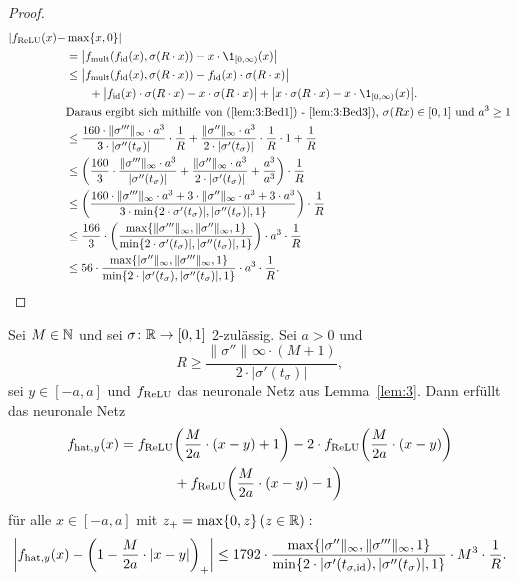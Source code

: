 \begin{proof}
\begin{equation*}
\begin{split}
|f_{\ReLU}(x) - & \max\{x, 0\}|  \\
& = \big| f_{\mult}(f_{\id}(x), \sigma(R \cdot x)) - x \cdot \1_{[0, \infty)}(x)\big| \\
& \leq \big| f_{\mult}(f_{\id}(x), \sigma(R \cdot x)) - f_{\id}(x)\cdot\sigma(R \cdot x)\big| \\
& \qquad + \big| f_{\id}(x)\cdot\sigma(R \cdot x) - x \cdot \sigma(R \cdot x)\big| + \big| x \cdot \sigma(R \cdot x) - x \cdot \1_{[0, \infty)}(x)\big|. \\
& \text{Daraus ergibt sich mithilfe von (\ref{lem:3:Bed1}) - \ref{lem:3:Bed3}), $\sigma(Rx) \in [0, 1]$ und $a^3 \geq 1$}\\
& \leq \frac{160 \cdot \|\sigma'''\|_{\infty} \cdot a ^3}{3 \cdot |\sigma''(t_{\sigma})|} \cdot \frac{1}{R} + \frac{\|\sigma''\|_{\infty} \cdot a^3}{2 \cdot |\sigma'(t_{\sigma})|} \cdot \frac{1}{R} \cdot 1+ \frac{1}{R} \\
& \leq \bigg(\frac{160}{3} \cdot \frac{\|\sigma'''\|_{\infty} \cdot a ^3}{|\sigma''(t_{\sigma})|} + \frac{\|\sigma''\|_{\infty} \cdot a^3}{2 \cdot |\sigma'(t_{\sigma})|} + \frac{a^3}{a^3} \bigg) \cdot \frac{1}{R} \\ 
& \leq \bigg(\frac{160 \cdot\|\sigma'''\|_{\infty} \cdot a ^3 + 3 \cdot \|\sigma''\|_{\infty} \cdot a^3 + 3 \cdot a^3}{3 \cdot \min\{ 2 \cdot \sigma'(t_{\sigma})|, |\sigma''(t_{\sigma})|, 1\}}\bigg) \cdot \frac{1}{R}\\
& \leq \frac{166}{3} \cdot \bigg(\frac{\max\{\|\sigma'''\|_{\infty}, \|\sigma''\|_{\infty} , 1\}}{\min\{ 2 \cdot \sigma'(t_{\sigma})|, |\sigma''(t_{\sigma})|, 1\}}\bigg) \cdot a^3 \cdot  \frac{1}{R} \\
& \leq 56 \cdot \frac{\max\{|\sigma''\|_{\infty}, \|\sigma'''\|_{\infty}, 1\}}{\min\{2 \cdot |\sigma'(t_{\sigma}), |\sigma''(t_{\sigma})|, 1\}} \cdot a^3 \cdot \frac{1}{R}.
\end{split}
\end{equation*}
  \end{proof}
  \begin{lem}
  \label{lem:4}
  Sei $M \in \mathbb{N}$ und sei $\sigma\colon \mathbb{R} \to [0, 1]$ 2-zulässig. Sei $a > 0$ und $$R \geq \frac{\|\sigma''\|_{}\infty \cdot (M + 1)}{2 \cdot |\sigma'(t_{\sigma})|},$$ sei $y \in [-a, a]$ und $f_{\mathrm{ReLU}}$ das neuronale Netz aus Lemma~\ref{lem:3}. Dann erfüllt das neuronale Netz 
  \begin{equation*}
  \begin{split}
  f_{\mathrm{hat},y}(x) = f_{\mathrm{ReLU}}& \bigg(\frac{M}{2a} \cdot (x - y) + 1\bigg) - 2 \cdot f_{\mathrm{ReLU}}\bigg(\frac{M}{2a} \cdot (x - y)\bigg) \\ &+ f_{\mathrm{ReLU}}\bigg(\frac{M}{2a} \cdot (x - y) - 1\bigg)
  \end{split}
  \end{equation*}
  für alle $x \in [-a ,a]$ mit $z_+ = \max\{0, z\} \, (z \in \mathbb{R}):$   
  $$\bigg|f_{\mathrm{hat},y}(x) - \bigg(1 - \frac{M}{2a} \cdot |x - y|\bigg)_+\bigg| \leq 1792 \cdot \frac{\max\{|\sigma''\|_{\infty}, \|\sigma'''\|_{\infty}, 1\}}{\min\{2 \cdot |\sigma'(t_{\sigma, \mathrm{id}}), |\sigma''(t_{\sigma})|, 1\}} \cdot M^3 \cdot \frac{1}{R}.$$
  \end{lem}
